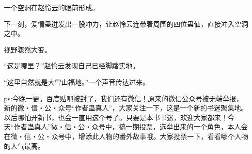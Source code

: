 \begin{this_body}
一个空洞在赵怜云的眼前形成。

下一刻，爱情蛊迸发出一股冲力，让赵怜云连带着周围的四位蛊仙，直接冲入空洞之中。

视野骤然大变。

“这是哪里？”赵怜云发现自己已经脚踏实地。

“这里自然就是大雪山福地。”一个声音传达过来。

ps:今晚一更。百度贴吧被封了，我们还有微信！原来的微信公众号被无端举报，新的微・信・公・众号“作者蛊真人”，大家关注一下，这是一个新的书迷聚集地。以后哪怕开新书，也会一直用这个号了。只要是本书书迷，欢迎大家都来！今天“作者蛊真人”微・信・公・众号中，搞一期投票，选举出来的一个角色，本人会在微・信・公・众号中，增添此人物的番外故事哦。大家投票一下，看看哪个人物的人气最高。

\end{this_body}


